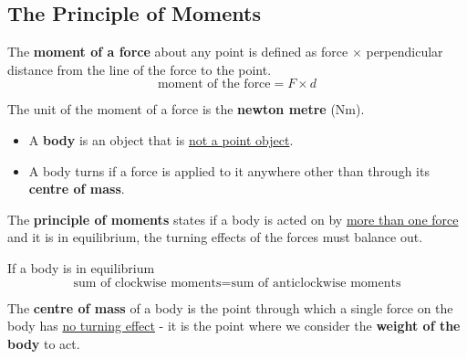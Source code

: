 \subsection{The Principle of Moments}

The \textbf{moment of a force} about any point is defined as force $\times$ perpendicular distance from the line of the force to the point.
$$\text{moment of the force}=F\times d$$

The unit of the moment of a force is the \textbf{newton metre} (Nm).

\begin{itemize}
    \item A \textbf{body} is an object that is \underline{not a point object}.
    \item A body turns if a force is applied to it anywhere other than through its \textbf{centre of mass}.
\end{itemize}

The \textbf{principle of moments} states if a body is acted on by \underline{more than one force} and it is in equilibrium, the turning effects of the forces must balance out.

If a body is in equilibrium
$$\text{sum of clockwise moments}=\text{sum of anticlockwise moments}$$

The \textbf{centre of mass} of a body is the point through which a single force on the body has \underline{no turning effect} - it is the point where we consider the \textbf{weight of the body} to act.

